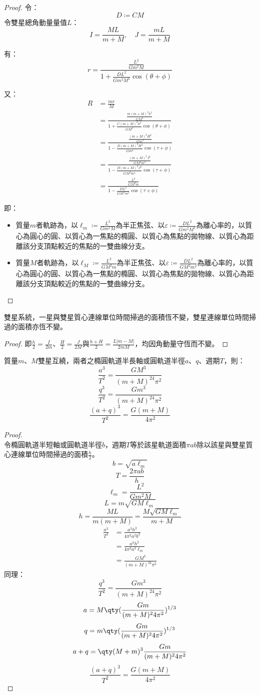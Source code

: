 \documentclass[a4paper,12pt]{article}
\begin{document}
\begin{proof}
令：
\[D\coloneq CM\]
令雙星總角動量量值$L$：
\[I=\frac{ML}{m+M},\quad J=\frac{mL}{m+M}\]

有：
\[r=\frac{\frac{L^2}{Gm^2M}}{1+\frac{DL^2}{Gm^2M^2}\cos(\theta+\phi)}\]

又：
\[\begin{aligned}
R&=\frac{mr}{M}\\
&=\frac{\frac{m(m+M)^2h^2}{GM^4}}{1+\frac{C(m+M)^2h^2}{GM^3}\cos(\theta+\phi)}\\
&=\frac{\frac{(m+M)^2H^2}{Gm^3}}{1-\frac{D(m+M)^2H^2}{Gm^4}\cos(\tau+\phi)}\\
&=\frac{\frac{(m+M)^2J^2}{GM^2m^3}}{1-\frac{D(m+M)^2J^2}{GM^2m^4}\cos(\tau+\phi)}\\
&=\frac{\frac{L^2}{GM^2m}}{1-\frac{DL^2}{GM^2m^2}\cos(\tau+\phi)}
\end{aligned}\]

即：
\begin{itemize}
\item 質量$m$者軌跡為，以$\ell_m\coloneq \frac{L^2}{Gm^2M}$為半正焦弦、以$\varepsilon\coloneq \frac{DL^2}{Gm^2M^2}$為離心率的，以質心為圓心的圓、以質心為一焦點的橢圓、以質心為焦點的拋物線、以質心為距離該分支頂點較近的焦點的一雙曲線分支。
\item 質量$M$者軌跡為，以$\ell_M\coloneq \frac{L^2}{GM^2m}$為半正焦弦、以$\varepsilon\coloneq \frac{DL^2}{GM^2m^2}$為離心率的，以質心為圓心的圓、以質心為一焦點的橢圓、以質心為焦點的拋物線、以質心為距離該分支頂點較近的焦點的一雙曲線分支。
\end{itemize}
\end{proof}
雙星系統，一星與雙星質心連線單位時間掃過的面積恆不變，雙星連線單位時間掃過的面積亦恆不變。
\begin{proof}
即$\frac{h}{2}=\frac{I}{2m}$、$\frac{H}{2}=\frac{J}{2M}$與$\frac{h+H}{2}=\frac{L|m-M|}{2mM}$，均因角動量守恆而不變。
\end{proof}
質量$m$、$M$雙星互繞，兩者之橢圓軌道半長軸或圓軌道半徑$a$、$q$、週期$T$，則：
\[\frac{a^3}{T^2}=\frac{GM^3}{(m+M)^24\pi^2}\]
\[\frac{q^3}{T^2}=\frac{Gm^3}{(m+M)^24\pi^2}\]
\[\frac{(a+q)^3}{T^2}=\frac{G(m+M)}{4\pi^2}\]
\begin{proof}\mbox{}\\
令橢圓軌道半短軸或圓軌道半徑$b$，週期$T$等於該星軌道面積$\pi ab$除以該星與雙星質心連線單位時間掃過的面積$\frac{h}{2}$。
\[b=\sqrt{a\ell_m}\]
\[T=\frac{2\pi ab}{h}\]
\[\ell_m=\frac{L^2}{Gm^2M}\]
\[L=m\sqrt{GM\ell_m}\]
\[h=\frac{ML}{m(m+M)}=\frac{M\sqrt{GM\ell_m}}{m+M}\]
\[\begin{aligned}
\frac{a^3}{T^2}&=\frac{a^3h^2}{4\pi^2 a^2b^2}\\
&=\frac{a^3h^2}{4\pi^2a^3\ell_m}\\
&=\frac{GM^3}{(m+M)^24\pi^2}
\end{aligned}\]
同理：
\[\frac{q^3}{T^2}=\frac{Gm^3}{(m+M)^24\pi^2}\]
\[a=M\qty(\frac{Gm}{(m+M)^24\pi^2})^{1/3}\]
\[q=m\qty(\frac{Gm}{(m+M)^24\pi^2})^{1/3}\]
\[a+q=\qty(M+m)^3\frac{Gm}{(m+M)^24\pi^2}\]
\[\frac{(a+q)^3}{T^2}=\frac{G(m+M)}{4\pi^2}\]
\end{proof}
\end{document}
